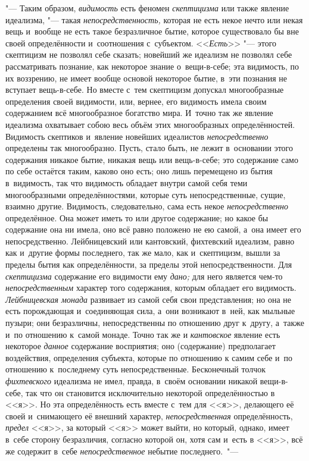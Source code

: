 "--- Таким образом, {\em видимость} есть феномен
{\em скептицизма} или также явление идеализма, "--- такая
{\em непосредственность,} которая не есть некое нечто
или некая вещь и~вообще не есть такое безразличное бытие, которое
существовало бы вне своей определённости и~соотношения с~субъектом.
<<{\em Есть}>> "--- этого скептицизм не позволял себе
сказать; новейший же идеализм не позволял себе рассматривать познание, как
некоторое знание о~вещи-в-себе; эта видимость, по их воззрению, не имеет
вообще основой некоторое бытие, в~эти познания не вступает вещь-в-себе. Но
вместе с~тем скептицизм допускал многообразные определения своей видимости,
или, вернее, его видимость имела своим содержанием всё многообразное
богатство мира. И~точно так же явление идеализма охватывает собою весь
объём этих многообразных определённостей. Видимость скептиков и~явление
новейших идеалистов {\em непосредственно} определены
так многообразно. Пусть, стало быть, не лежит в~основании этого содержания
никакое бытие, никакая вещь или вещь-в-себе; это содержание само по себе
остаётся таким, каково оно есть; оно лишь перемещено из бытия в~видимость,
так что видимость обладает внутри самой себя теми многообразными
определённостями, которые суть непосредственные, сущие, взаимно другие.
Видимость, следовательно, сама есть некое
{\em непосредственно} определённое. Она может иметь то
или другое содержание; но какое бы содержание она ни имела, оно всё равно
положено не ею самой, а~она имеет его непосредственно. Лейбницевский или
кантовский, фихтевский идеализм, равно как и~другие формы последнего, так
же мало, как и~скептицизм, вышли за пределы бытия как определённости, за
пределы этой непосредственности. Для {\em скептицизма}
содержание его видимости ему {\em дано;} для него
является чем-то {\em непосредственным} характер того
содержания, которым обладает его видимость.
{\em Лейбницевская монада} развивает из самой себя свои
представления; но она не есть порождающая и~соединяющая сила, а~они
возникают в~ней, как мыльные пузыри; они безразличны, непосредственны по
отношению друг к~другу, а~также и~по отношению к~самой монаде. Точно так же
и {\em кантовское} явление есть некоторое
{\em данное} содержание восприятия; оно (содержание)
предполагает воздействия, определения субъекта, которые по отношению к
самим себе и~по отношению к~последнему суть непосредственные. Бесконечный
толчок
{\em фихтевского} идеализма не имел, правда, в~своём
основании никакой вещи-в-себе, так что он становится исключительно
некоторой определённостью в <<я>>. Но эта определённость есть вместе с~тем
для <<я>>, делающего её своей и~снимающего её внешний характер,
{\em непосредственная} определённость,
{\em предел} <<я>>, за который <<я>> может выйти, но
который, однако, имеет в~себе сторону безразличия, согласно которой он,
хотя сам и~есть в <<я>>, всё же содержит в~себе
{\em непосредственное} небытие последнего.~"---


